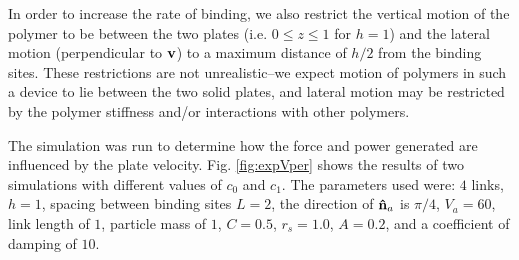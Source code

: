 \documentclass[11pt]{ucthesis}
\def\nhat{{\bf\hat n}}
\begin{document}
In order to increase the rate of binding, we also restrict the vertical motion of the polymer to be between the two plates (i.e. $0\leq z\leq 1$ for $h=1$) and the lateral motion (perpendicular to $\bf{v}$) to a maximum distance of $h/2$ from the binding sites. These restrictions are not unrealistic--we expect motion of polymers in such a device to lie between the two solid plates, and lateral motion may be restricted by the polymer stiffness and/or interactions with other polymers.

The simulation was run to determine how the force and power 
generated are influenced by the plate velocity. Fig. \ref{fig:expVper} shows the
results of two simulations with different values of $c_0$ and $c_1$.
The parameters used were: $4$ links, $h=1$, spacing between binding sites $L = 2$, the direction of $\nhat_a$ 
is $\pi/4$, $V_a=60$, link length of $1$, particle mass of $1$, $C=0.5$,
$r_s = 1.0$, $A = 0.2$, and a coefficient of damping of $10$.
\end{document}
